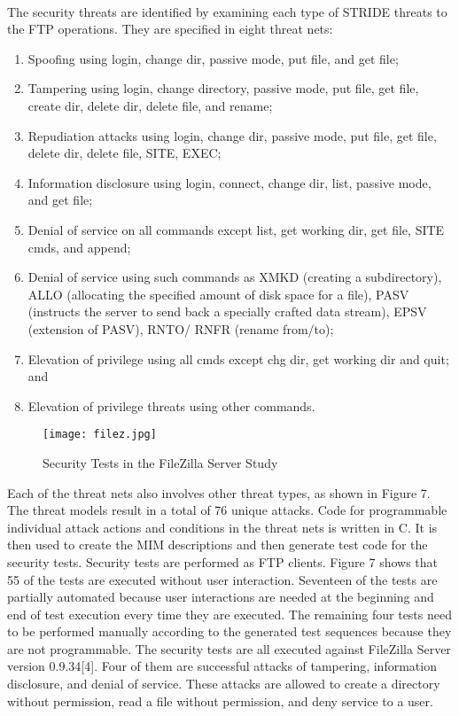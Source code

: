 \paragraph*{}
The security threats are identified by examining each
type of STRIDE threats to the FTP operations. They are
specified in eight threat nets:
\begin{enumerate}
\item Spoofing using login, change dir, passive mode, put
file, and get file;
\item Tampering using login, change directory, passive
mode, put file, get file, create dir, delete dir, delete
file, and rename;
\item Repudiation attacks using login, change dir, passive
mode, put file, get file, delete dir, delete file, SITE,
EXEC;
\item Information disclosure using login, connect, change
dir, list, passive mode, and get file;
\item Denial of service on all commands except list, get
working dir, get file, SITE cmds, and append;
\item Denial of service using such commands as XMKD
(creating a subdirectory), ALLO (allocating the
specified amount of disk space for a file), PASV
(instructs the server to send back a specially crafted
data stream), EPSV (extension of PASV), RNTO/
RNFR (rename from/to);
\item Elevation of privilege using all cmds except chg dir,
get working dir and quit; and
\item Elevation of privilege threats using other commands.
\end{enumerate}
\begin{figure}
\centering
\texttt{[image: filez.jpg]}
\caption{Security Tests in the FileZilla Server Study}
\label{Fig:Figure 7}
\end{figure}
Each of the threat nets also involves other threat types, as
shown in Figure 7. The threat models result in a total of 76
unique attacks. Code for programmable individual attack
actions and conditions in the threat nets is written in C. It is
then used to create the MIM descriptions and then generate
test code for the security tests. Security tests are performed as
FTP clients. Figure 7 shows that 55 of the tests are executed
without user interaction. Seventeen of the tests are partially
automated because user interactions are needed at the
beginning and end of test execution every time they are
executed. The remaining four tests need to be performed manually according to the
generated test sequences because they are not programmable.
The security tests are all executed against FileZilla
Server version 0.9.34[4]. Four of them are successful attacks of
tampering, information disclosure, and denial of service.
These attacks are allowed to create a directory without
permission, read a file without permission, and deny service
to a user.
\newpage
